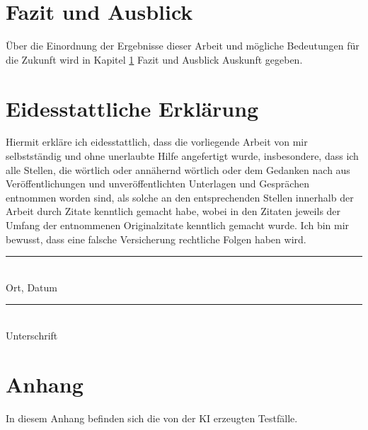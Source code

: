 \documentclass[12pt,toc=bib,toc=listof]{scrreprt}
\begin{document}
\chapter{Fazit und Ausblick} %
\label{sec:fazitUndAusblick}
Über die Einordnung der Ergebnisse dieser Arbeit und mögliche Bedeutungen für die Zukunft wird in Kapitel \ref{sec:fazitUndAusblick} Fazit und Ausblick Auskunft gegeben.

\printbibliography
\newpage

\chapter*{Eidesstattliche Erklärung} %
\label{sec:eidesstattlicheErklärung}
Hiermit erkläre ich eidesstattlich, dass die vorliegende Arbeit von mir selbstständig und ohne unerlaubte Hilfe angefertigt wurde, insbesondere, dass ich alle Stellen, die wörtlich oder annähernd wörtlich oder dem Gedanken nach aus Veröffentlichungen und unveröffentlichten Unterlagen und Gesprächen entnommen worden sind, als solche an den entsprechenden Stellen innerhalb der Arbeit durch Zitate kenntlich gemacht habe, wobei in den Zitaten jeweils der Umfang der entnommenen Originalzitate kenntlich gemacht wurde. Ich bin mir bewusst, dass eine falsche Versicherung rechtliche Folgen haben wird.
\newline
\newline
\newline
\newline
\noindent
\begin{minipage}[t]{0.4\textwidth} 
    \centering 
    \rule{\textwidth}{0.4pt} \\ 
    Ort, Datum
\end{minipage}%
\hfill
\begin{minipage}[t]{0.4\textwidth} 
    \centering 
    \rule{\textwidth}{0.4pt} \\ 
    Unterschrift
\end{minipage}

\chapter*{Anhang} %
\label{sec:anhang}
In diesem Anhang befinden sich die von der KI erzeugten Testfälle.

\end{document}
